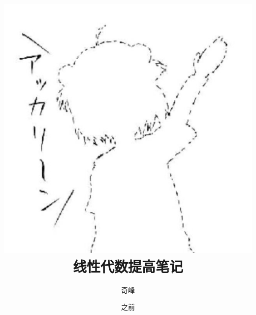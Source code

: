 \documentclass[oneside]{ctexbook}
\title{\includegraphics[scale=0.6]{1.jpg}\\ \textsf{线性代数提高笔记}}
\author{奇峰}
\date{之前}
\begin{document}
\theoremseparator{}
\newtheorem{def1}{定义}[section]
\newtheorem{theo1}{定理}[section]
\newtheorem{func1}{方法}[section]
\newtheorem{infer1}{推论}[section]
\newenvironment{proof}{\begin{itemize}\item \textbf{证明}
	
	}{\end{itemize}}


\newenvironment{Def}[1][\quad{}]{\begin{def1}\textbf{#1}}{\end{def1}}
\newenvironment{Theo}[1][\quad{}]{\begin{theo1}\textbf{#1}}{\end{theo1}}
\newenvironment{Func}[1][\quad{}]{\begin{func1}\textbf{#1}}{\end{func1}}
\newenvironment{Infer}[1][\quad{}]{\begin{infer1}\textbf{#1}}{\end{infer1}}
\newenvironment{Field}[1][\quad{}]{\noindent\newline\textbf{#1}}{}

\setlength{\parskip}{3pt}

\frontmatter
\maketitle
\hypertarget{Index}{}
\tableofcontents

\mainmatter





\end{document}
